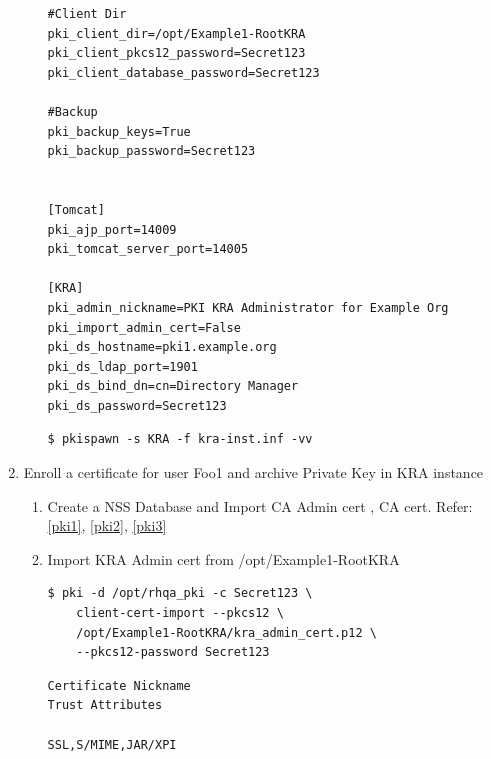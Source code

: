 \documentclass[12pt]{report}
\begin{document}
\begin{enumerate}[label*=\arabic*.]
\begin{enumerate}[label*=\arabic*.]
\begin{lstlisting}[style=configFile]
#Client Dir
pki_client_dir=/opt/Example1-RootKRA
pki_client_pkcs12_password=Secret123
pki_client_database_password=Secret123

#Backup
pki_backup_keys=True
pki_backup_password=Secret123


[Tomcat]
pki_ajp_port=14009
pki_tomcat_server_port=14005

[KRA]
pki_admin_nickname=PKI KRA Administrator for Example Org
pki_import_admin_cert=False
pki_ds_hostname=pki1.example.org
pki_ds_ldap_port=1901
pki_ds_bind_dn=cn=Directory Manager
pki_ds_password=Secret123
                \end{lstlisting}
                \begin{lstlisting}[style=bashInputStyle]
$ pkispawn -s KRA -f kra-inst.inf -vv   
                \end{lstlisting}
            \end{enumerate}
        \item \label{arch_privatekey} Enroll a certificate for user Foo1 and archive Private Key in KRA instance
            \begin{enumerate}[label*=\arabic*.]
                \item Create a NSS Database and Import CA Admin cert , CA cert. Refer:\ref{pki1}, \ref{pki2}, \ref{pki3}
                \item Import KRA Admin cert from /opt/Example1-RootKRA
                    \begin{lstlisting}[style=bashInputStyle]
$ pki -d /opt/rhqa_pki -c Secret123 \
    client-cert-import --pkcs12 \
    /opt/Example1-RootKRA/kra_admin_cert.p12 \
    --pkcs12-password Secret123
                    \end{lstlisting}
                    \begin{lstlisting}
Certificate Nickname                                         Trust Attributes
                                                             SSL,S/MIME,JAR/XPI


\end{lstlisting}
\end{enumerate}
\end{enumerate}
\end{document}
